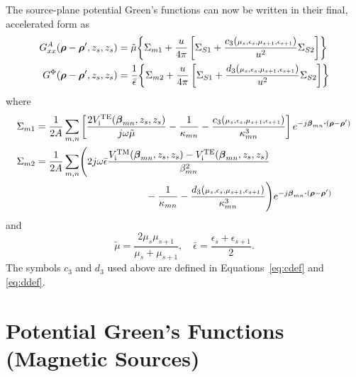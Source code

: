 The source-plane potential Green's functions can now be written in
their final, accelerated form as
\begin{subequations}
  \label{eq:finalEGF}
  \begin{align}
    G^A_{xx}(\boldsymbol{\rho}-\boldsymbol{\rho}',z_s,z_s) &=  
    \tilde{\mu}
    \biggl\{
    \Sigma_{m1} + 
    \frac{u}{4\pi}
    \left[
      \Sigma_{S1} + \frac{c_3({\scriptstyle
          \mu_s,\epsilon_s,\mu_{s+1},\epsilon_{s+1}})}{u^2} \Sigma_{S2}
    \right]
    \biggr\} \\
    G^\Phi(\boldsymbol{\rho}-\boldsymbol{\rho}',z_s,z_s) &=
    \frac{1}{\bar{\epsilon}}
    \biggl\{
    \Sigma_{m2} +
    \frac{u}{4\pi}
    \left[
      \Sigma_{S1} + \frac{d_3({\scriptstyle
          \mu_s,\epsilon_s,\mu_{s+1},\epsilon_{s+1}})}{u^2} \Sigma_{S2}
    \right]
    \biggr\} 
  \end{align}
\end{subequations}
where
\begin{subequations}
  \begin{align}
    \Sigma_{m1} &= 
    \frac{1}{2A} \summn
    \left[
      \frac{2\Vi\TE({\vecbeta_{mn},z_s,z_s})}{j\omega\tilde{\mu}} 
      - \frac{1}{\kappa_{mn}} -
      \frac{c_3({\scriptstyle\mu_s,\epsilon_s,\mu_{s+1},\epsilon_{s+1}})}{\kappa_{mn}^3}
    \right]  e^{-j\vecbeta_{mn}\bdot(\vecrho-\vecrho')} \\
    \Sigma_{m2} &= 
    \frac{1}{2A} \summn
    \Biggl(
    2j\omega\bar{\epsilon}
    \frac{\Vi\TM({\vecbeta_{mn},z_s,z_s})-\Vi\TE({\vecbeta_{mn},z_s,z_s})}%
    {\beta_{mn}^2}  \nonumber \\
    & \mbox{} \mkern 200mu - \frac{1}{\kappa_{mn}} -
    \frac{d_3({\scriptstyle\mu_s,\epsilon_s,\mu_{s+1},\epsilon_{s+1}})}{\kappa_{mn}^3}
    \Biggr)  e^{-j\vecbeta_{mn}\bdot(\vecrho-\vecrho')} 
  \end{align}
  \label{eq:finalmodalelectric}
\end{subequations}
and
\begin{equation}
  \tilde{\mu} =
  \frac{2\mu_s\mu_{s+1}}{\mu_s+\mu_{s+1}},
  \quad
  \bar{\epsilon} = \frac{\epsilon_s + \epsilon_{s+1}}{2}.
\end{equation}
The symbols $c_3$ and $d_3$ used above are defined in Equations~\ref{eq:cdef}
and \ref{eq:ddef}.






\section{Potential Green's Functions (Magnetic Sources)}

